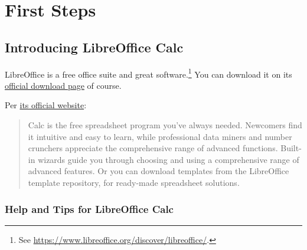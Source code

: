 \section{First Steps}
\label{sec:first-steps}

\subsection{Introducing LibreOffice Calc}
\label{subsec:introducing-libreoffice-calc}

LibreOffice is a free office suite and great software.\footnote{See \href{https://www.libreoffice.org/discover/libreoffice/}{https://www.libreoffice.org/discover/libreoffice/}.}
You can download it on its   \href{https://www.libreoffice.org/download/download/}{official download page} of course.

Per \href{https://www.libreoffice.org/discover/calc/}{its official website}:
\begin{quote}\small
	Calc is the free spreadsheet program you've always needed. Newcomers find it intuitive and easy to learn, while professional data miners and number crunchers appreciate the comprehensive range of advanced functions. Built-in wizards guide you through choosing and using a comprehensive range of advanced features. Or you can download templates from the LibreOffice template repository, for ready-made spreadsheet solutions.
\end{quote}

\subsubsection{Help and Tips for LibreOffice Calc}
\label{subsubsec:help-tips-for-libreoffice-calc}

